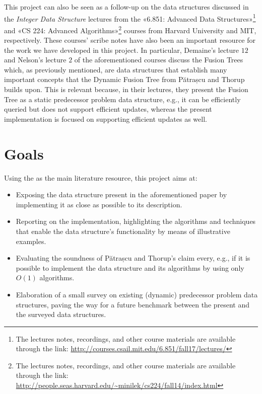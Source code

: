 This project can also be seen as a follow-up on the data structures discussed in the \textit{Integer Data Structure} lectures from the «6.851: Advanced Data Structures»\footnote{The lectures notes, recordings, and other course materials are available through the link: \url{http://courses.csail.mit.edu/6.851/fall17/lectures/}} and «CS 224: Advanced Algorithms»\footnote{The lectures notes, recordings, and other course materials are available through the link: \url{http://people.seas.harvard.edu/~minilek/cs224/fall14/index.html}} courses from Harvard University and MIT, respectively.
These courses' scribe notes have also been an important resource for the work we have developed in this project.
In particular, Demaine's lecture $12$ \cite{erikdemainelec12} and Nelson's lecture $2$ \cite{nelsonjelanilec2} of the aforementioned courses discuss the Fusion Trees which, as previously mentioned, are data structures that establish many important concepts that the Dynamic Fusion Tree from Pătrașcu and Thorup builds upon. 
This is relevant because, in their lectures, they present the Fusion Tree as a static predecessor problem data structure, e.g., it can be efficiently queried but does not support efficient updates, whereas the present implementation is focused on supporting efficient updates as well.

\section{Goals}

Using the \cite{patrascu2014dynamic} as the main literature resource, this project aims at:
\begin{itemize}
    \item
    Exposing the data structure present in the aforementioned paper by implementing it as close as possible to its description.
    
    \item
    Reporting on the implementation, highlighting the algorithms and techniques that enable the data structure's functionality by means of illustrative examples.
    
    \item
    Evaluating the soundness of Pătrașcu and Thorup's claim every, e.g., if it is possible to implement the data structure and its algorithms by using only $O(1)$ algorithms.
    
    \item
    Elaboration of a small survey on existing (dynamic) predecessor problem data structures, paving the way for a future benchmark between the present and the surveyed data structures.
\end{itemize}

